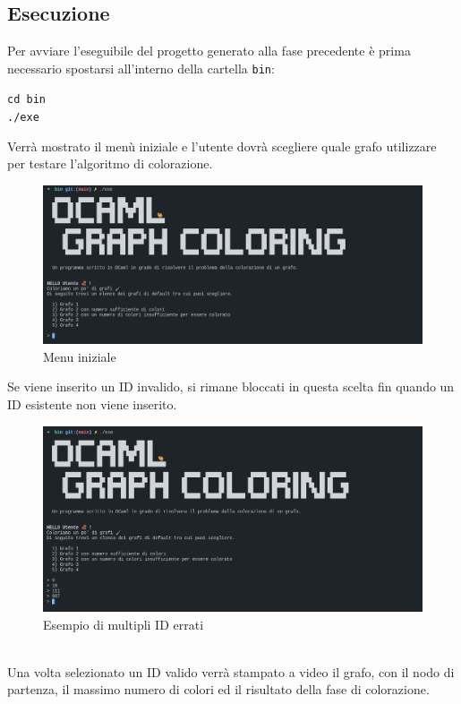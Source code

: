 \subsection{Esecuzione}

Per avviare l'eseguibile del progetto generato alla fase precedente è prima necessario spostarsi all'interno della cartella \lstinline[style=cmd]|bin|:

\begin{center}
	\lstinline[style=cmd]|cd bin|\\
	\lstinline[style=cmd]|./exe  |
\end{center}

Verrà mostrato il menù iniziale e l'utente dovrà scegliere quale grafo utilizzare per testare l'algoritmo di colorazione.

\begin{figure}[H]
	\centering
	\includegraphics[width=.8\textwidth]{img/menu.png}
	\caption{Menu iniziale}
\end{figure}

Se viene inserito un ID invalido, si rimane bloccati in questa scelta fin quando un ID esistente non viene inserito.

\begin{figure}[H]
	\centering
	\includegraphics[width=.8\textwidth]{img/badid.png}
	\caption{Esempio di multipli ID errati}
\end{figure}
\ \\
Una volta selezionato un ID valido verrà stampato a video il grafo, con il nodo di partenza, il massimo numero di colori ed il risultato della fase di colorazione.

